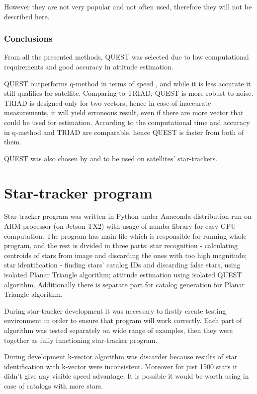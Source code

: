 \documentclass[12pt,a4paper,twoside]{article}
\begin{document}
However they are not very popular and not often used, therefore they will not be described here.

\subsubsection{Conclusions}


From all the presented methods, QUEST was selected due to low computational requirements and good accuracy in attitude estimation.

QUEST outperforms q-method in terms of speed \cite{markley1999estimate}, and while it is less accurate it still qualifies for satellite. Comparing to TRIAD, QUEST is more robust to noise. TRIAD is designed only for two vectors, hence in case of inaccurate measurements, it will yield erroneous result, even if there are more vector that could be used for estimation. According to \citet{ccelik2013comparison} the computational time and accuracy in q-method and TRIAD are comparable, hence QUEST is faster from both of them.

QUEST was also chosen by \citet{huffman2006designing} and \citet{tappe2009development} to be used on satellites' star-trackers.

\newpage
\section{Star-tracker program}

Star-tracker program was written in Python under Anaconda distribution run on ARM processor (on Jetson TX2) with usage of numba library for easy GPU computation. The program has main file which is responsible for running whole program, and the rest is divided in three parts: star recognition - calculating centroids of stars from image and discarding the ones with too high magnitude; star identification - finding stars' catalog IDs and discarding false stars, using isolated Planar Triangle algorithm; attitude estimation using isolated QUEST algorithm. Additionally there is separate part for catalog generation for Planar Triangle algorithm.

During star-tracker development it was necessary to firstly create testing environment in order to ensure that program will work correctly. Each part of algorithm was tested separately on wide range of examples, then they were together as fully functioning star-tracker program.

During development k-vector algorithm was discarder because results of star identification with k-vector were inconsistent. Moreover for just 1500 stars it didn't give any visible speed advantage. It is possible it would be worth using in case of catalogs with more stars.
\end{document}
